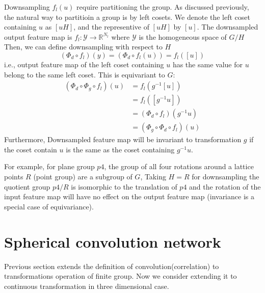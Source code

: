 \documentclass{article}
\begin{document}
Downsampling $f_{l}(u)$ require partitioning the group. As discussed previously, the natural way to partitioin a group
is by left cosets. We denote the left coset containing $u$ as $[uH]$, and the representive of $[uH]$ by $[u]$. The downsampled output feature map is 
$f_l\colon \mathcal{Y} \to \mathbb{R}^{N_l}$ where $\mathcal{Y}$ is the homogeneous space of $G/H$
Then, we can define downsampling with respect to $H$
\begin{equation}
    (\Phi_d \circ f_l)(y) = (\Phi_d \circ f_l(u)) = f_l([u])
\end{equation}
i.e., output feature map of the left coset containing $u$ has the same value for $u$ belong to the same left coset. 
This is equivariant to $G$:
\begin{align*}
    (\Phi_d \circ \Phi_g \circ f_l)(u) &= f_l(g^{-1}[u]) \\
    &= f_l([g^{-1}u]) \\
    &= (\Phi_d \circ f_l)(g^{-1}u) \\
    &= (\Phi_g \circ \Phi_d \circ f_l)(u)
\end{align*}
Furthermore, Downsampled feature map will be invariant to transformation $g$ 
if the coset contain $u$ is the same as the coset containing $g^{-1}u$.



For example, for plane group $p4$, the group of all four rotations around a lattice points $R$ (point group) are a subgroup of $G$,
Taking $H = R$ for downsampling
the quotient group $p4/R$ is isomorphic to the translation of $p4$ and 
the rotation of the input feature map will have no effect on the output feature map (invariance is a special case of equivariance). 

\section{Spherical convolution network}
Previous section extends the definition of convolution(correlation) to transformations operation of finite group. 
Now we consider extending it to continuous transformation\cite{cohen_spherical_2018} in three dimensional case. 
\end{document}
